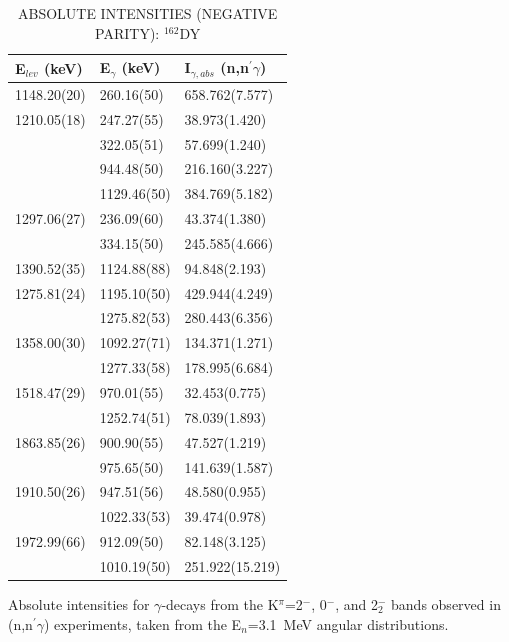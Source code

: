\begin{table}[h!]
\begin{center}
 \caption{ABSOLUTE INTENSITIES (NEGATIVE PARITY): $^{162}$DY  \label{tab:162Dy_neg202_intensities}}

\begin{tabular}{l|l|l}
E$_{lev}$ (keV) & E$_\gamma$ (keV) & I$_{\gamma,abs}$ (n,n$^\prime\gamma$)  \\ \hline\hline
 1148.20(20) &  260.16(50) & 658.762(7.577)\\  \hline
 1210.05(18) &  247.27(55) &  38.973(1.420)\\
             &  322.05(51) &  57.699(1.240)\\
             &  944.48(50) & 216.160(3.227)\\
             & 1129.46(50) & 384.769(5.182)\\\hline
 1297.06(27) &  236.09(60) &  43.374(1.380)\\
             &  334.15(50) & 245.585(4.666)\\\hline
 1390.52(35) & 1124.88(88) &  94.848(2.193)\\\hline
 1275.81(24) & 1195.10(50) & 429.944(4.249)\\
             & 1275.82(53) & 280.443(6.356)\\\hline
 1358.00(30) & 1092.27(71) & 134.371(1.271)\\
             & 1277.33(58) & 178.995(6.684)\\\hline
 1518.47(29)&   970.01(55) &  32.453(0.775)\\
            &  1252.74(51) &  78.039(1.893)\\\hline
 1863.85(26)&   900.90(55) &  47.527(1.219)\\
            &   975.65(50) & 141.639(1.587)\\\hline
 1910.50(26)&   947.51(56) &  48.580(0.955)\\
            &  1022.33(53) &  39.474(0.978)\\\hline
 1972.99(66)&   912.09(50) &  82.148(3.125)\\
            &  1010.19(50) & 251.922(15.219)\\\hline
\end{tabular}
\end{center}
Absolute intensities for $\gamma$-decays from the K$^\pi$=2$^-$, 0$^-$, and 2$^-_2$ bands observed in (n,n$^\prime\gamma$) experiments, taken from the E$_n$=3.1~MeV angular distributions.
\end{table}

